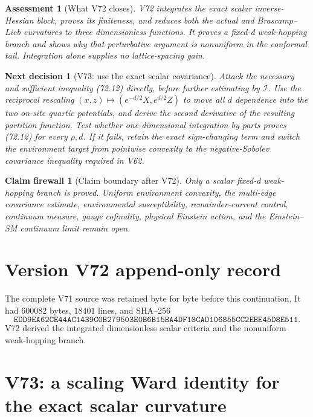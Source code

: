 \documentclass[11pt]{article}
\newtheorem{firewall}[theorem]{Claim firewall}
\newtheorem{decision}[theorem]{Next decision}
\newtheorem{assessment}[theorem]{Assessment}
\theoremstyle{remark}
\begin{document}
\begin{assessment}[What V72 closes]
\label{ass:v17v72-status}
V72 integrates the exact scalar inverse-Hessian block, proves its
finiteness, and reduces both the actual and Brascamp--Lieb curvatures
to three dimensionless functions.  It proves a fixed-d weak-hopping
branch and shows why that perturbative argument is nonuniform in the
conformal tail.  Integration alone supplies no lattice-spacing gain.
\end{assessment}

\begin{decision}[V73: use the exact scalar covariance]
\label{dec:v17v72-next}
Attack the necessary and sufficient inequality (72.12) directly,
before further estimating by \(\mathcal I\).  Use the reciprocal
rescaling \((x,z)\mapsto(e^{-d/2}X,e^{d/2}Z)\) to move all \(d\)
dependence into the two on-site quartic potentials, and derive the
second derivative of the resulting partition function.  Test whether
one-dimensional integration by parts proves (72.12) for every
\(\rho,d\).  If it fails, retain the exact sign-changing term and
switch the environment target from pointwise convexity to the
negative-Sobolev covariance inequality required in V62.
\end{decision}

\begin{firewall}[Claim boundary after V72]
\label{fire:v17v72}
Only a scalar fixed-d weak-hopping branch is proved.  Uniform
environment convexity, the multi-edge covariance estimate,
environmental susceptibility, remainder-current control, continuum
measure, gauge cofinality, physical Einstein action, and the
Einstein--SM continuum limit remain open.
\end{firewall}

\section*{Version V72 append-only record}
The complete V71 source was retained byte for byte before this
continuation.  It had \(600082\) bytes, \(18401\) lines, and SHA--256
\[
 \texttt{EDD9EA62CE44AC1439C0B279503E0B6B15BA4DF18CAD106855CC2EBE45D8E511}.
\]
V72 derived the integrated dimensionless scalar criteria and the
nonuniform weak-hopping branch.


\section{V73: a scaling Ward identity for the exact scalar curvature}
\label{sec:v17v73}
\end{document}
